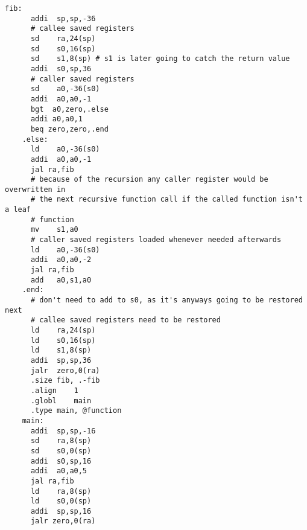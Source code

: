 \documentclass[varwidth, convert]{standalone}
\begin{document}
  \begin{BVerbatim}[gobble=4]
    fib:
      addi	sp,sp,-36
      # callee saved registers
      sd	ra,24(sp)
      sd	s0,16(sp)
      sd	s1,8(sp) # s1 is later going to catch the return value
      addi	s0,sp,36
      # caller saved registers
      sd	a0,-36(s0)
      addi  a0,a0,-1
      bgt  a0,zero,.else
      addi a0,a0,1
      beq zero,zero,.end
    .else:
      ld	a0,-36(s0)
      addi	a0,a0,-1
      jal ra,fib
      # because of the recursion any caller register would be overwritten in
      # the next recursive function call if the called function isn't a leaf
      # function
      mv	s1,a0
      # caller saved registers loaded whenever needed afterwards
      ld	a0,-36(s0)
      addi	a0,a0,-2
      jal ra,fib
      add	a0,s1,a0
    .end:
      # don't need to add to s0, as it's anyways going to be restored next
      # callee saved registers need to be restored
      ld	ra,24(sp)
      ld	s0,16(sp)
      ld	s1,8(sp)
      addi	sp,sp,36
      jalr	zero,0(ra)
      .size	fib, .-fib
      .align	1
      .globl	main
      .type	main, @function
    main:
      addi	sp,sp,-16
      sd	ra,8(sp)
      sd	s0,0(sp)
      addi	s0,sp,16
      addi  a0,a0,5
      jal ra,fib
      ld	ra,8(sp)
      ld	s0,0(sp)
      addi	sp,sp,16
      jalr zero,0(ra)
  \end{BVerbatim}
\end{document}

